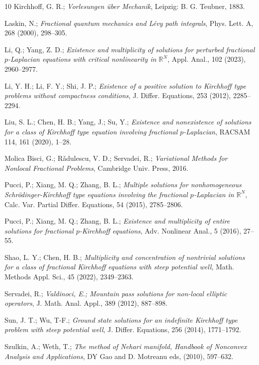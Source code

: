 \documentclass[reqno]{amsart}
\begin{document}
\begin{thebibliography}{10}
 Kirchhoff, G. R.;
\emph{Vorlesungen \"{u}ber Mechanik},
Leipzig: B. G. Teubner, 1883.

 Laskin, N.;
\emph{Fractional quantum mechanics and L\'{e}vy path integrals},
Phys. Lett. A, 268 (2000), 298--305.

 Li, Q.; Yang, Z. D.;
\emph{Existence and multiplicity of solutions for perturbed fractional 
$p$-Laplacian equations with critical nonlinearity in $\mathbb{R}^N$},
Appl. Anal., 102 (2023), 2960--2977.

 Li, Y. H.; Li, F. Y.; Shi, J. P.;
\emph{Existence of a positive solution to Kirchhoff type problems without 
compactness conditions},
J. Differ. Equations, 253 (2012), 2285--2294.

 Liu, S. L.; Chen, H. B.; Yang, J.; Su, Y.;
\emph{Existence and nonexistence of solutions for a class of Kirchhoff type 
equation involving fractional $p$-Laplacian},
RACSAM 114, 161 (2020), 1--28.

 Molica Bisci, G.; R\v{a}dulescu, V. D.; Servadei, R.;
\emph{Variational Methods for Nonlocal Fractional Problems},
Cambridge Univ. Press, 2016.

 Pucci, P.; Xiang, M. Q.; Zhang, B. L.;
\emph{Multiple solutions for nonhomogeneous Schr\"{o}dinger-Kirchhoff type equations involving the fractional $p$-Laplacian in $\mathbb{R}^N$},
Calc. Var. Partial Differ. Equations, 54 (2015), 2785--2806.

 Pucci, P.; Xiang, M. Q.; Zhang, B. L.;
\emph{Existence and multiplicity of entire solutions for fractional $p$-Kirchhoff equations},
Adv. Nonlinear Anal., 5 (2016), 27--55.

 Shao, L. Y.; Chen, H. B.;
\emph{Multiplicity and concentration of nontrivial solutions for a class of fractional Kirchhoff equations with steep potential well},
Math. Methods Appl. Sci., 45 (2022), 2349--2363.

 Servadei, R.;
\emph{Valdinoci, E.; Mountain pass solutions for non-local elliptic operators},
J. Math. Anal. Appl., 389 (2012), 887--898.

 Sun, J. T.; Wu, T-F.;
\emph{Ground state solutions for an indefinite Kirchhoff type problem with steep potential well},
J. Differ. Equations, 256 (2014), 1771--1792.

 Szulkin, A.; Weth, T.;
\emph{The method of Nehari manifold, Handbook of Nonconvex Analysis and Applications},
DY Gao and D. Motreanu eds, (2010), 597--632.


\end{thebibliography}
\end{document}

